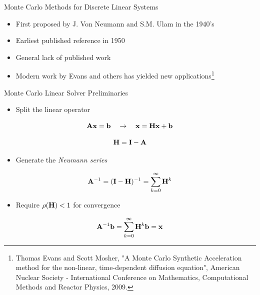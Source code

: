 \documentclass{beamer}
\begin{document}
\begin{frame}{Monte Carlo Methods for Discrete Linear Systems}

  \begin{itemize}
  \item First proposed by J. Von Neumann and S.M. Ulam in the 1940's
    \medskip \medskip
  \item Earliest published reference in 1950
    \medskip \medskip
  \item General lack of published work
    \medskip \medskip
  \item Modern work by Evans and others has yielded new
    applications\let\thefootnote\relax\footnote{\tiny{Thomas Evans and
        Scott Mosher, "A Monte Carlo Synthetic Acceleration method for
        the non-linear, time-dependent diffusion equation", American
        Nuclear Society - International Conference on Mathematics,
        Computational Methods and Reactor Physics, 2009.}}
  \end{itemize}
\end{frame}

\begin{frame}{Monte Carlo Linear Solver Preliminaries}

  \begin{itemize}
  \item Split the linear operator
  \end{itemize}

  \[
  \mathbf{A}\mathbf{x} = \mathbf{b} \ \ \ \rightarrow \ \ \ \mathbf{x} = \mathbf{H} \mathbf{x}
  + \mathbf{b}
  \]

  \[
  \mathbf{H} = \mathbf{I} - \mathbf{A}
  \]

  \medskip
  \begin{itemize}
  \item Generate the \textit{Neumann series}
  \end{itemize}
  
  \[
  \mathbf{A}^{-1} = (\mathbf{I}-\mathbf{H})^{-1} = \sum_{k=0}^{\infty} \mathbf{H}^k
  \]

  \medskip
  \begin{itemize}
  \item Require $\rho(\mathbf{H}) < 1$ for convergence
  \end{itemize}

  \[
  \mathbf{A}^{-1}\mathbf{b} = \sum_{k=0}^{\infty} \mathbf{H}^k\mathbf{b} = \mathbf{x}
  \]

\end{frame}
\end{document}
